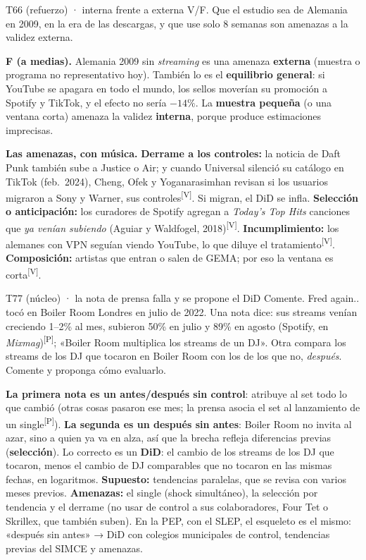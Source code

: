 \documentclass[10pt,a4paper]{article}
\newcommand{\V}{\textsuperscript{\textcolor{green!45!black}{[V]}}}
\newcommand{\Pre}{\textsuperscript{\textcolor{orange!80!black}{[P]}}}
\begin{document}
\begin{enun}{T66 (refuerzo) · interna frente a externa}
V/F. Que el estudio sea de Alemania en 2009, en la era de las descargas, y que use solo 8 semanas son amenazas a la validez externa.
\end{enun}
\begin{ejemplar}
\textbf{F (a medias).} Alemania 2009 sin \emph{streaming} es una amenaza \textbf{externa} (muestra o programa no representativo hoy). También lo es el \textbf{equilibrio general}: si YouTube se apagara en todo el mundo, los sellos moverían su promoción a Spotify y TikTok, y el efecto no sería $-14\%$. La \textbf{muestra pequeña} (o una ventana corta) amenaza la validez \textbf{interna}, porque produce estimaciones imprecisas.
\end{ejemplar}

\textbf{Las amenazas, con música.} \textbf{Derrame a los controles:} la noticia de Daft Punk también sube a Justice o Air; y cuando Universal silenció su catálogo en TikTok (feb.\ 2024), Cheng, Ofek y Yoganarasimhan revisan si los usuarios migraron a Sony y Warner, sus controles\V. Si migran, el DiD se infla. \textbf{Selección o anticipación:} los curadores de Spotify agregan a \emph{Today's Top Hits} canciones que \emph{ya venían subiendo} (Aguiar y Waldfogel, 2018)\V. \textbf{Incumplimiento:} los alemanes con VPN seguían viendo YouTube, lo que diluye el tratamiento\V. \textbf{Composición:} artistas que entran o salen de GEMA; por eso la ventana es corta\V.

\begin{enun}{T77 (núcleo) · la nota de prensa falla y se propone el DiD}
Comente. Fred again.. tocó en Boiler Room Londres en julio de 2022. Una nota dice: sus streams venían creciendo 1--2\% al mes, subieron 50\% en julio y 89\% en agosto (Spotify, en \emph{Mixmag})\Pre; «Boiler Room multiplica los streams de un DJ». Otra compara los streams de los DJ que tocaron en Boiler Room con los de los que no, \emph{después}. Comente y proponga cómo evaluarlo.
\end{enun}
\begin{ejemplar}
\textbf{La primera nota es un antes/después sin control}: atribuye al set todo lo que cambió (otras cosas pasaron ese mes; la prensa asocia el set al lanzamiento de un single\Pre). \textbf{La segunda es un después sin antes}: Boiler Room no invita al azar, sino a quien ya va en alza, así que la brecha refleja diferencias previas (\textbf{selección}). Lo correcto es un \textbf{DiD}: el cambio de los streams de los DJ que tocaron, menos el cambio de DJ comparables que no tocaron en las mismas fechas, en logaritmos. \textbf{Supuesto:} tendencias paralelas, que se revisa con varios meses previos. \textbf{Amenazas:} el single (shock simultáneo), la selección por tendencia y el derrame (no usar de control a sus colaboradores, Four Tet o Skrillex, que también suben). En la PEP, con el SLEP, el esqueleto es el mismo: «después sin antes» → DiD con colegios municipales de control, tendencias previas del SIMCE y amenazas.
\end{ejemplar}
\end{document}
